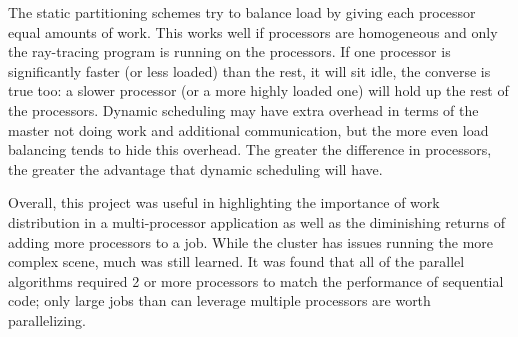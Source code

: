 \documentclass[11pt]{article}
\begin{document}
	The static partitioning schemes try to balance load by giving each processor equal amounts of work. This works well if processors are homogeneous and only the ray-tracing program is running on the processors. If one processor is significantly faster (or less loaded) than the rest, it will sit idle, the converse is true too: a slower processor (or a more highly loaded one) will hold up the rest of the processors. Dynamic scheduling may have extra overhead in terms of the master not doing work and additional communication, but the more even load balancing tends to hide this overhead. The greater the difference in processors, the greater the advantage that dynamic scheduling will have.
	
	Overall, this project was useful in highlighting the importance of work distribution in a multi-processor application as well as the diminishing returns of adding more processors to a job. While the cluster has issues running the more complex scene, much was still learned. It was found that all of the parallel algorithms required 2 or more processors to match the performance of sequential code; only large jobs than can leverage multiple processors are worth parallelizing. 
\end{document}
